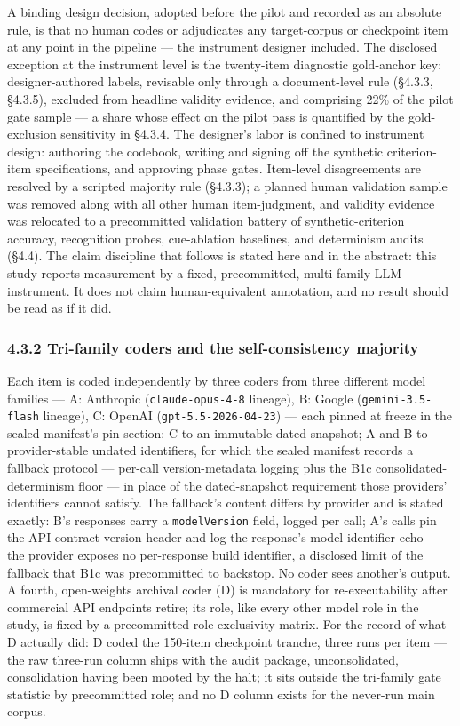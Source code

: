 A binding design decision, adopted before the pilot and recorded as an absolute rule, is that no human codes or adjudicates any target-corpus or checkpoint item at any point in the pipeline --- the instrument designer included. The disclosed exception at the instrument level is the twenty-item diagnostic gold-anchor key: designer-authored labels, revisable only through a document-level rule (\S{}4.3.3, \S{}4.3.5), excluded from headline validity evidence, and comprising 22\% of the pilot gate sample --- a share whose effect on the pilot pass is quantified by the gold-exclusion sensitivity in \S{}4.3.4. The designer's labor is confined to instrument design: authoring the codebook, writing and signing off the synthetic criterion-item specifications, and approving phase gates. Item-level disagreements are resolved by a scripted majority rule (\S{}4.3.3); a planned human validation sample was removed along with all other human item-judgment, and validity evidence was relocated to a precommitted validation battery of synthetic-criterion accuracy, recognition probes, cue-ablation baselines, and determinism audits (\S{}4.4). The claim discipline that follows is stated here and in the abstract: this study reports measurement by a fixed, precommitted, multi-family LLM instrument. It does not claim human-equivalent annotation, and no result should be read as if it did.

\subsubsection{4.3.2 Tri-family coders and the self-consistency majority}\label{tri-family-coders-and-the-self-consistency-majority}

Each item is coded independently by three coders from three different model families --- A: Anthropic (\texttt{claude-opus-4-8} lineage), B: Google (\texttt{gemini-3.5-flash} lineage), C: OpenAI (\texttt{gpt-5.5-2026-04-23}) --- each pinned at freeze in the sealed manifest's pin section: C to an immutable dated snapshot; A and B to provider-stable undated identifiers, for which the sealed manifest records a fallback protocol --- per-call version-metadata logging plus the B1c consolidated-determinism floor --- in place of the dated-snapshot requirement those providers' identifiers cannot satisfy. The fallback's content differs by provider and is stated exactly: B's responses carry a \texttt{modelVersion} field, logged per call; A's calls pin the API-contract version header and log the response's model-identifier echo --- the provider exposes no per-response build identifier, a disclosed limit of the fallback that B1c was precommitted to backstop. No coder sees another's output. A fourth, open-weights archival coder (D) is mandatory for re-executability after commercial API endpoints retire; its role, like every other model role in the study, is fixed by a precommitted role-exclusivity matrix. For the record of what D actually did: D coded the 150-item checkpoint tranche, three runs per item --- the raw three-run column ships with the audit package, unconsolidated, consolidation having been mooted by the halt; it sits outside the tri-family gate statistic by precommitted role; and no D column exists for the never-run main corpus.

